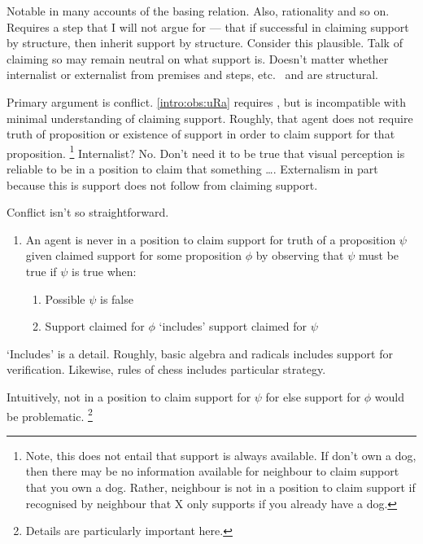 \begin{note}
  Notable in many accounts of the basing relation.
  Also, rationality and so on.
  Requires a step that I will not argue for --- that if successful in claiming support by structure, then inherit support by structure.
  Consider this plausible.
  Talk of claiming so may remain neutral on what support is.
  Doesn't matter whether internalist or externalist from premises and steps, etc.\
  \AR{} and \WR{} are structural.

  Primary argument is conflict.
  \ref{intro:obs:uRa} requires \AR{}, but \AR{} is incompatible with minimal understanding of claiming support.
  Roughly, that agent does not require truth of proposition or existence of support in order to claim support for that proposition.\nolinebreak
  \footnote{
    Note, this does not entail that support is always available.
    If don't own a dog, then there may be no information available for neighbour to claim support that you own a dog.
    Rather, neighbour is not in a position to claim support if recognised by neighbour that X only supports if you already have a dog.
  }
  Internalist?
  No.
  Don't need it to be true that visual perception is reliable to be in a position to claim that something \dots.
  Externalism in part because this is support does not follow from claiming support.

  Conflict isn't so straightforward.

  \begin{enumerate}[label=(O\arabic*), ref=(O\arabic*), resume*=i_ob]
  \item\label{intro:obs:nI} An agent is never in a position to claim support for truth of a proposition \(\psi\) given claimed support for some proposition \(\phi\) by observing that \(\psi\) must be true if \(\psi\) is true when:
    \begin{enumerate}[label=(\alph*), ref=(O\arabic{enumi}\alph*)]
    \item\label{intro:obs:nI:pFalse} Possible \(\psi\) is false
    \item\label{intro:obs:nI:inclusion} Support claimed for \(\phi\) `includes' support claimed for \(\psi\)
    \end{enumerate}
  \end{enumerate}
  `Includes' is a detail.
  Roughly, basic algebra and radicals includes support for verification.
  Likewise, rules of chess includes particular strategy.

  Intuitively, not in a position to claim support for \(\psi\) for else support for \(\phi\) would be problematic.\nolinebreak
  \footnote{
    Details are particularly important here.

}
\end{note}

